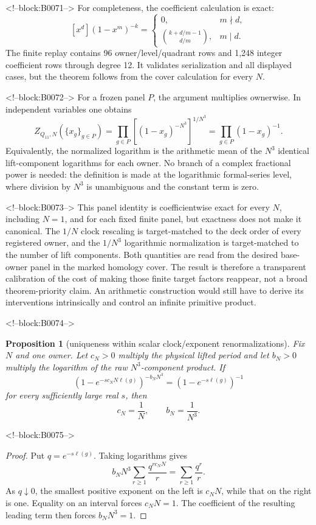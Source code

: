 \documentclass[11pt]{article}
\newtheorem{proposition}[theorem]{Proposition}
\theoremstyle{definition}
\theoremstyle{remark}
\begin{document}
<!--block:B0071-->
For completeness, the coefficient calculation is exact:
\[
[x^d](1-x^m)^{-k}=
\begin{cases}
0,&m\nmid d,\\
\binom{k+d/m-1}{d/m},&m\mid d.
\end{cases}
\]
The finite replay contains 96 owner/level/quadrant rows and 1,248 integer coefficient rows through degree 12. It validates serialization and all displayed cases, but the theorem follows from the cover calculation for every $N$.

<!--block:B0072-->
For a frozen panel $P$, the argument multiplies ownerwise. In independent variables one obtains
\[
Z_{Q_{11},N}(\{x_g\}_{g\in P})
=\prod_{g\in P}\left[(1-x_g)^{-N^3}\right]^{1/N^3}
=\prod_{g\in P}(1-x_g)^{-1}.
\]
Equivalently, the normalized logarithm is the arithmetic mean of the $N^3$ identical lift-component logarithms for each owner. No branch of a complex fractional power is needed: the definition is made at the logarithmic formal-series level, where division by $N^3$ is unambiguous and the constant term is zero.

<!--block:B0073-->
This panel identity is coefficientwise exact for every $N$, including $N=1$, and for each fixed finite panel, but exactness does not make it canonical. The $1/N$ clock rescaling is target-matched to the deck order of every registered owner, and the $1/N^3$ logarithmic normalization is target-matched to the number of lift components. Both quantities are read from the desired base-owner panel in the marked homology cover. The result is therefore a transparent calibration of the cost of making those finite target factors reappear, not a broad theorem-priority claim. An arithmetic construction would still have to derive its interventions intrinsically and control an infinite primitive product.

<!--block:B0074-->
\begin{proposition}[uniqueness within scalar clock/exponent renormalizations]\label{prop:unique-renorm}
Fix $N$ and one owner. Let $c_N>0$ multiply the physical lifted period and let $b_N>0$ multiply the logarithm of the raw $N^3$-component product. If
\[
\left(1-e^{-s c_NN\ell(g)}\right)^{-b_NN^3}
=\left(1-e^{-s\ell(g)}\right)^{-1}
\]
for every sufficiently large real $s$, then
\[
c_N=\frac1N,
\qquad
b_N=\frac1{N^3}.
\]
\end{proposition}

<!--block:B0075-->
\begin{proof}
Put $q=e^{-s\ell(g)}$. Taking logarithms gives
\[
b_NN^3\sum_{r\geq1}\frac{q^{r c_NN}}r
=\sum_{r\geq1}\frac{q^r}r.
\]
As $q\downarrow0$, the smallest positive exponent on the left is $c_NN$, while that on the right is one. Equality on an interval forces $c_NN=1$. The coefficient of the resulting leading term then forces $b_NN^3=1$.
\end{proof}
\end{document}
